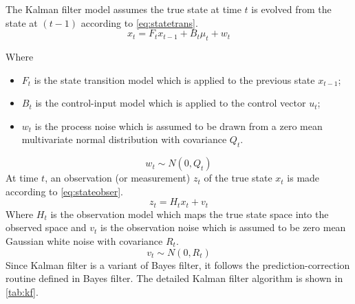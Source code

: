 The Kalman filter model assumes the true state at time $t$ is evolved from the state at $(t-1)$ according to \autoref{eq:statetrans}.
\begin{equation}
\label{eq:statetrans}
x_t = F_tx_{t-1}+B_t\mu_t+w_t
\end{equation}

Where
\begin{itemize}
  \item $F_t$ is the state transition model which is applied to the previous state $x_{t-1}$;
  \item $B_t$ is the control-input model which is applied to the control vector $u_t$;
  \item $w_t$ is the process noise which is assumed to be drawn from a zero mean multivariate normal distribution with covariance $Q_t$.
\end{itemize}
\begin{equation}
\label{eq:Q}
w_t \sim N(0,Q_t)
\end{equation}
At time $t$, an observation (or measurement) $z_t$ of the true state $x_t$ is made according to \autoref{eq:stateobser}.
\begin{equation}
\label{eq:stateobser}
z_t = H_tx_t + v_t
\end{equation}
Where $H_t$ is the observation model which maps the true state space into the observed space and $v_t$ is the observation noise which is assumed to be zero mean Gaussian white noise with covariance $R_t$.
\begin{equation}
\label{eq:R}
v_t \sim N(0,R_t)
\end{equation}
Since Kalman filter is a variant of Bayes filter, it follows the prediction-correction routine defined in Bayes filter. The detailed Kalman filter algorithm is shown in \autoref{tab:kf}. \\

